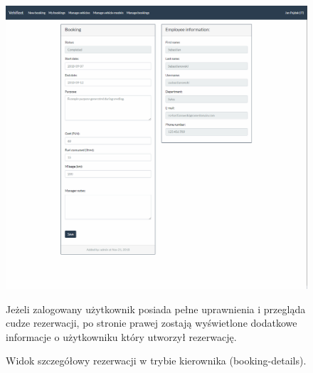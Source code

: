 \documentclass[eng,printmode,openany]{mgr}
\begin{document}
	\begin{figure}[H]
		\centering
		\includegraphics[width=\textwidth]{images/views/booking-detail-manager.png}
		\caption{Widok szczegółowy rezerwacji w trybie kierownika (booking-details).}
		\small 
		Jeżeli zalogowany użytkownik posiada pełne uprawnienia i przegląda cudze rezerwacji, po stronie prawej zostają wyświetlone dodatkowe informacje o użytkowniku który utworzył rezerwację.
	\end{figure}
	
\end{document}
